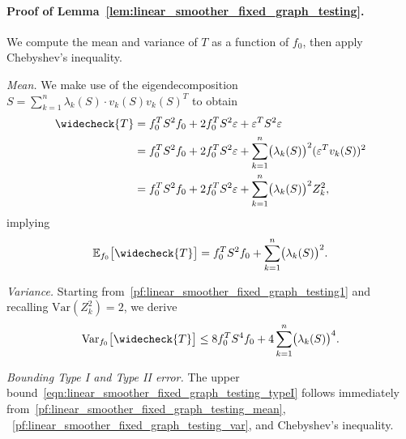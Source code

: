 \documentclass[twoside]{article}
\newcommand{\Var}{\mathrm{Var}}
\newcommand{\1}{\mathbf{1}}
\newcommand{\Ebb}{\mathbb{E}}
\newcommand{\wc}[1]{\widecheck{#1}}
\theoremstyle{definition}
\theoremstyle{remark}
\begin{document}
\paragraph{Proof of Lemma~\ref{lem:linear_smoother_fixed_graph_testing}.}
We compute the mean and variance of $T$ as a function of $f_0$, then apply Chebyshev's inequality.

\textit{Mean.} We make use of the eigendecomposition $S = \sum_{k = 1}^{n} \lambda_k(S) \cdot v_k(S) v_k(S)^T$ to obtain
\begin{equation}
\label{pf:linear_smoother_fixed_graph_testing1}
\begin{aligned}
\wc{T} & = f_0^T S^2 f_0 + 2 f_0^T S^2 \varepsilon + \varepsilon^T S^2 \varepsilon \\
& = f_0^T S^2 f_0 + 2 f_0^T S^2 \varepsilon + \sum_{k = 1}^{n}  \bigl(\lambda_k(S)\bigr)^2 (\varepsilon^T v_k(S))^2 \\
& = f_0^T S^2 f_0 + 2 f_0^T S^2 \varepsilon + \sum_{k = 1}^{n}  \bigl(\lambda_k(S)\bigr)^2 Z_k^2,
\end{aligned}
\end{equation}
implying
\begin{equation}
\label{pf:linear_smoother_fixed_graph_testing_mean}
\Ebb_{f_0}\bigl[\wc{T}\bigr] = f_0^T S^2 f_0 + \sum_{k = 1}^{n} \bigl(\lambda_k(S)\bigr)^2.
\end{equation}

\textit{Variance.} Starting from~\eqref{pf:linear_smoother_fixed_graph_testing1} and recalling $\Var(Z_k^2) = 2$, we derive
\begin{equation}
\label{pf:linear_smoother_fixed_graph_testing_var}
\Var_{f_0}\bigl[\wc{T}\bigr] \leq 8 f_0^T S^4 f_0 + 4 \sum_{k = 1}^{n} \bigl(\lambda_k(S)\bigr)^4.
\end{equation}

\textit{Bounding Type I and Type II error.} The upper bound~\eqref{eqn:linear_smoother_fixed_graph_testing_typeI} follows immediately from~\eqref{pf:linear_smoother_fixed_graph_testing_mean}, ~\eqref{pf:linear_smoother_fixed_graph_testing_var}, and Chebyshev's inequality.
\end{document}
